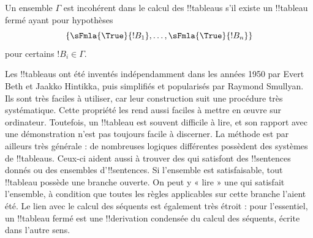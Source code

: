 \documentclass[../../../include/open-logic-section]{subfiles}
\begin{document}
Un ensemble $\Gamma$ est incohérent dans le calcul des !!{tableau}s
s'il existe un !!{tableau} fermé ayant pour hypothèses
\[
\{\sFmla{\True}{!B_1}, \dots, \sFmla{\True}{!B_n}\}
\]
pour certains $!B_i \in \Gamma$.

Les !!{tableau}s ont été inventés indépendamment dans les années 1950
par Evert Beth et Jaakko Hintikka, puis simplifiés et popularisés par
Raymond Smullyan. Ils sont très faciles à utiliser, car leur construction
suit une procédure très systématique. Cette propriété les rend aussi
faciles à mettre en œuvre sur ordinateur. Toutefois, un !!{tableau}
est souvent difficile à lire, et son rapport avec une démonstration
n'est pas toujours facile à discerner. La méthode est par ailleurs très
générale : de nombreuses logiques différentes possèdent des systèmes de
!!{tableau}s. Ceux-ci aident aussi à trouver des
 qui satisfont des !!{sentence}s
donnés ou des ensembles d'!!{sentence}s. Si l'ensemble est satisfaisable,
tout !!{tableau} possède une branche ouverte. On peut y « lire » une
 qui satisfait l'ensemble, à
condition que toutes les règles applicables sur cette branche l'aient été.
Le lien avec le calcul des séquents est
également très étroit : pour l'essentiel, un !!{tableau} fermé est une
!!{derivation} condensée du calcul des séquents, écrite dans l'autre sens.
\end{document}
